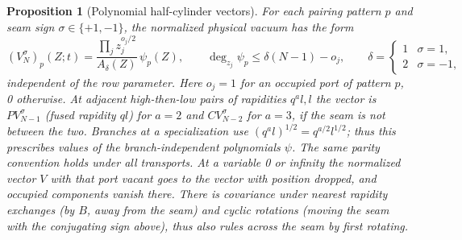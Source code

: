 \documentclass[11pt]{article}
\numberwithin{equation}{section}
\newtheorem{proposition}[theorem]{Proposition}
\theoremstyle{definition}\newtheorem{definition}[theorem]{Definition}
\theoremstyle{remark}\newtheorem{remark}[theorem]{Remark}
\begin{document}
\begin{proposition}[Polynomial half-cylinder vectors]\label{L:prop:vacuum-polynomials}
For each pairing pattern $p$ and seam sign $\sigma\in\{+1,-1\}$, the
normalized physical vacuum has the form
\[
 (V^\sigma_N)_p(Z;t)
    = \frac{\prod_j z_j^{o_j/2}}{A_\delta(Z)}\,\psi_{p}(Z),
 \qquad \deg_{z_j}\psi_p\le\delta(N-1)-o_j ,
 \qquad
 \delta=\begin{cases}1&\sigma=1,\\2&\sigma=-1,\end{cases}
\]
independent of the row parameter. Here \(o_j=1\) for an occupied port of pattern \(p\), 0 otherwise. At adjacent high-then-low pairs of rapidities \(q^a l,l\) the vector is \(P V^\sigma_{N-1}\) (fused rapidity \(q l\)) for \(a=2\) and \(C V^\sigma_{N-2}\) for \(a=3\), if the seam is not between the two. Branches at a specialization use \((q^a l)^{1/2}=q^{a/2}l^{1/2}\); thus this prescribes values of the branch-independent polynomials \(\psi\). The same parity convention holds under all transports. At a variable 0 or infinity the normalized vector \(V\) with that port vacant goes to the vector with position dropped, and occupied components vanish there. There is covariance under nearest rapidity exchanges (by \(B\), away from the seam) and cyclic rotations (moving the seam with the conjugating sign above), thus also rules across the seam by first rotating.

\end{proposition}
\end{document}

